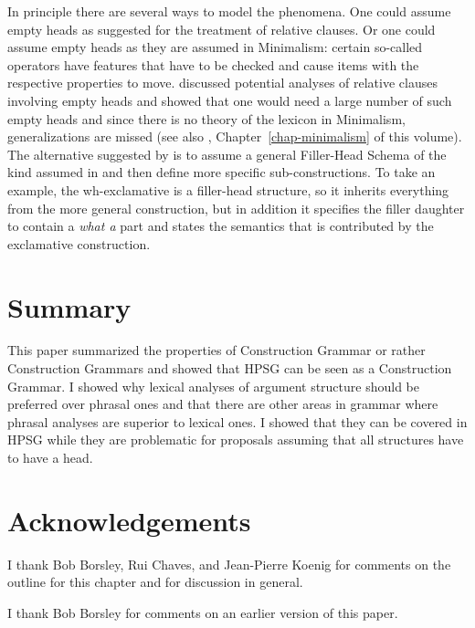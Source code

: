 \documentclass[output=paper]{langsci/langscibook}
\begin{document}
In principle there are several ways to model the phenomena. One could assume empty
heads as \citet[Chapter~5]{ps2} suggested for the treatment of relative clauses. Or one could assume empty
heads as they are assumed in Minimalism: certain so-called operators have features that have to be
checked and cause items with the respective properties to move. \citet{Borsley2006a} discussed potential
analyses of relative clauses involving empty heads and showed that one would need a large number of
such empty heads and since there is no theory of the lexicon in Minimalism, generalizations are
missed (see also \citealt{BM2018Minimalism}, Chapter~\ref{chap-minimalism} of this volume). The alternative suggested by
\citet{Sag2010b} is to assume a general Filler-Head Schema of the kind assumed in  and
then define more specific sub-constructions. To take an example, the wh-exclamative is a filler-head
structure, so it inherits everything from the more general construction, but in addition it
specifies the filler daughter to contain a \emph{what a} part and states the semantics that is
contributed by the exclamative construction.


\section{Summary}
\label{sec-summary}

This paper summarized the properties of Construction Grammar or rather Construction Grammars and
showed that HPSG can be seen as a Construction Grammar. I showed why lexical analyses of argument structure should be
preferred over phrasal ones and that there are other areas in grammar where phrasal analyses are
superior to lexical ones. I showed that they can be covered in HPSG while they are problematic for
proposals assuming that all structures have to have a head. 


\section*{Acknowledgements}

I thank Bob Borsley, Rui Chaves, and Jean-Pierre Koenig for comments on the outline for this chapter and for discussion in general.

I thank Bob Borsley for comments on an earlier version of this paper.

{\sloppy
\printbibliography[heading=subbibliography,notkeyword=this] 
}
\end{document}
